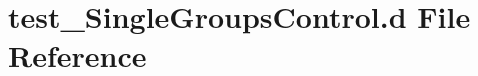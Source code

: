 \hypertarget{test___single_groups_control_8d}{}\section{test\+\_\+\+Single\+Groups\+Control.\+d File Reference}
\label{test___single_groups_control_8d}
